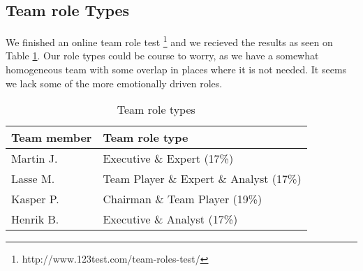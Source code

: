 \subsection{Team role Types}
We finished an online team role test \footnote{http://www.123test.com/team-roles-test/} and we recieved the results as seen on 
Table \ref{tab:roleTypes}. Our role types could be course to worry, as we have a somewhat homogeneous team with some overlap in places where
it is not needed. It seems we lack some of the more emotionally driven roles.
\begin{table}[!ht]
    \centering
    \begin{tabular}{l|l}
        \rowcolor{Gray}
        \textbf{Team member} & \textbf{Team role type}\\\hline
        Martin J.            & Executive \& Expert (17\%) \\
        Lasse M.             & Team Player \& Expert \& Analyst (17\%) \\
        Kasper P.            & Chairman \& Team Player (19\%) \\
        Henrik B.            & Executive \& Analyst (17\%)
    \end{tabular}
    \caption{Team role types}
    \label{tab:roleTypes}
\end{table}
